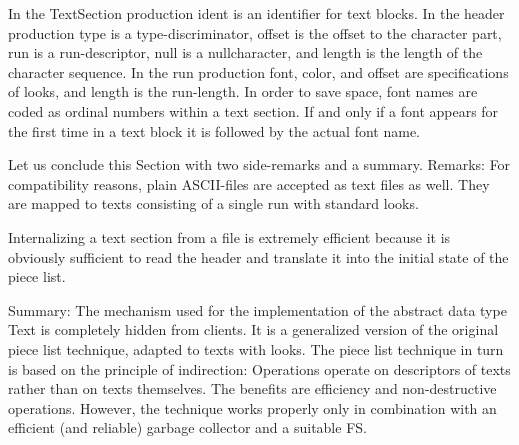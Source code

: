 In the TextSection production ident is an identifier for text blocks. In the header production type is a
type-discriminator, offset is the offset to the character part, run is a run-descriptor, null is a nullcharacter, and length is the length of the character sequence. In the run production font, color, and
offset are specifications of looks, and length is the run-length. In order to save space, font names
are coded as ordinal numbers within a text section. If and only if a font appears for the first time in a
text block it is followed by the actual font name.

Let us conclude this Section with two side-remarks and a summary.
Remarks:
For compatibility reasons, plain ASCII-files are accepted as text files as well. They are mapped
to texts consisting of a single run with standard looks.

Internalizing a text section from a file is extremely efficient because it is obviously sufficient to
read the header and translate it into the initial state of the piece list.

Summary: The mechanism used for the implementation of the abstract data type Text is completely
hidden from clients. It is a generalized version of the original piece list technique, adapted to texts
with looks. The piece list technique in turn is based on the principle of indirection: Operations
operate on descriptors of texts rather than on texts themselves. The benefits are efficiency and
non-destructive operations. However, the technique works properly only in combination with an
efficient (and reliable) garbage collector and a suitable FS.


